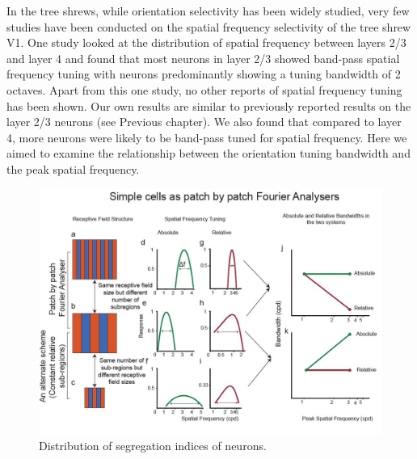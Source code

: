 	In the tree shrews, while orientation selectivity has been widely studied, very few studies have been conducted on the spatial frequency selectivity of the tree shrew V1. One study looked at the distribution of spatial frequency between layers 2/3 and layer 4 and found that most neurons in layer 2/3 showed band-pass spatial frequency tuning with neurons predominantly showing a tuning bandwidth of 2 octaves. Apart from this one study, no other reports of spatial frequency tuning has been shown. Our own results are similar to previously reported results on the layer 2/3 neurons (see Previous chapter). We also found that compared to layer 4, more neurons were likely to be band-pass tuned for spatial frequency. Here we aimed to examine the relationship between the orientation tuning bandwidth and the peak spatial frequency.
	
	\begin{figure}[H]
		
		\includegraphics[width=\linewidth]{LinearV1/scheme.jpg}
		\caption{Distribution of segregation indices of neurons.}
		\label{fig:summary}
	\end{figure}

